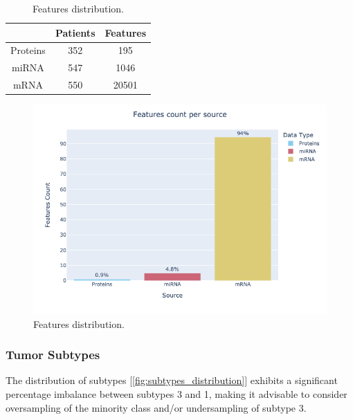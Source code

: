 \documentclass[12pt,a4paper]{article}
\begin{document}
\begin{table}[h]
\centering
\begin{tabular}{|c|c|c|}
\hline
          & Patients & Features \\
\hline
Proteins & 352 & 195 \\
miRNA & 547 & 1046 \\
mRNA & 550 & 20501 \\
\hline
\end{tabular}
\caption{Features distribution.}
\label{tab:table}
\end{table}

\begin{figure}[htbp!]
\begin{center}
\includegraphics[width=0.9\columnwidth]{./static/features-count-per-source.png}
\end{center}
\caption{Features distribution.}
\label{fig:features-count-per-source}
\end{figure}


\subsubsection{Tumor Subtypes}
The distribution of subtypes [\ref{fig:subtypes_distribution}] exhibits a significant percentage imbalance between subtypes 3 and 1, making it advisable to consider oversampling of the minority class and/or undersampling of subtype 3.
\end{document}
